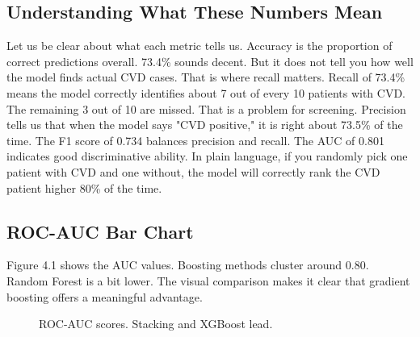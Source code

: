 \documentclass[12pt, a4paper, oneside]{book}
\begin{document}
\subsection{Understanding What These Numbers Mean}
Let us be clear about what each metric tells us. Accuracy is the proportion of correct predictions overall. 73.4\% sounds decent. But it does not tell you how well the model finds actual CVD cases. That is where recall matters. Recall of 73.4\% means the model correctly identifies about 7 out of every 10 patients with CVD. The remaining 3 out of 10 are missed. That is a problem for screening. Precision tells us that when the model says "CVD positive," it is right about 73.5\% of the time. The F1 score of 0.734 balances precision and recall. The AUC of 0.801 indicates good discriminative ability. In plain language, if you randomly pick one patient with CVD and one without, the model will correctly rank the CVD patient higher 80\% of the time.

\subsection{ROC-AUC Bar Chart}
Figure 4.1 shows the AUC values. Boosting methods cluster around 0.80. Random Forest is a bit lower. The visual comparison makes it clear that gradient boosting offers a meaningful advantage.

\begin{figure}[H]
\centering
\vspace{12pt}
\vspace{12pt}
\caption{ROC-AUC scores. Stacking and XGBoost lead.}
\label{fig:auc_bar}
\end{figure}
\end{document}
